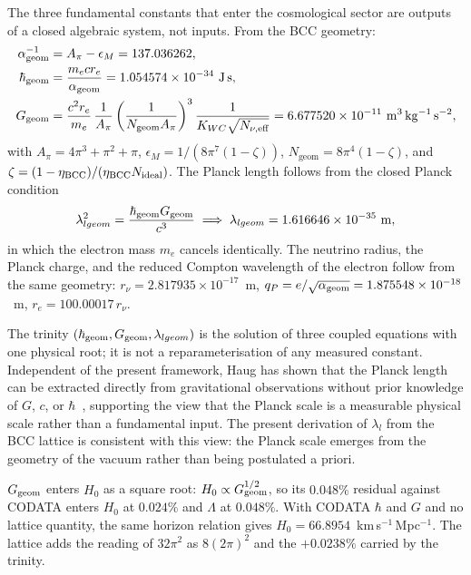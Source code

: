 \documentclass[10pt,a4paper]{article}
\begin{document}
The three fundamental constants that enter the cosmological sector are
outputs of a closed algebraic system, not inputs. From the BCC
geometry:
\begin{align}
	\alpha_{\rm geom}^{-1} &= A_\pi - \epsilon_M
	= 137.036262, \label{eq:summary_alpha}\\
	\hbar_{\rm geom} &= \frac{m_e c r_e}{\alpha_{\rm geom}}
	= 1.054574\times 10^{-34}\ {\rm J\,s}, \label{eq:summary_hbar}\\
	G_{\rm geom} &= \frac{c^2 r_e}{m_e}\,
	\frac{1}{A_\pi}\left(\frac{1}{N_{\text{geom}}A_\pi}\right)^{3}
	\frac{1}{K_{WC}\sqrt{N_{\nu,\text{eff}}}}
	= 6.677520\times 10^{-11}\ {\rm m^3\,kg^{-1}\,s^{-2}},
	\label{eq:summary_G}
\end{align}
with \(A_\pi = 4\pi^3 + \pi^2 + \pi\), \(\epsilon_M = 1/(8\pi^7(1-\zeta))\),
\(N_{\text{geom}} = 8\pi^4(1-\zeta)\), and
\(\zeta = (1-\eta_{\rm BCC})/(\eta_{\rm BCC} N_{\text{ideal}})\).
The Planck length follows from the closed Planck condition
\begin{equation}
	\lambda_{l geom}^2 = \frac{\hbar_{\rm geom} G_{\rm geom}}{c^3}
	\;\Longrightarrow\;
	\lambda_{l geom} = 1.616646\times 10^{-35}\ {\rm m},
	\label{eq:summary_lambda}
\end{equation}
in which the electron mass \(m_e\) cancels identically. The neutrino
radius, the Planck charge, and the reduced Compton wavelength of the
electron follow from the same geometry:
\(r_\nu = 2.817935\times 10^{-17}\)~m,
\(q_P = e/\sqrt{\alpha_{\rm geom}} = 1.875548\times 10^{-18}\)~m,
\(r_e = 100.00017\,r_\nu\).

The trinity \((\hbar_{\rm geom}, G_{\rm geom}, \lambda_{l geom})\) is the
solution of three coupled equations with one physical root; it is not
a reparameterisation of any measured constant. Independent of the
present framework, Haug has shown that the Planck length can be
extracted directly from gravitational observations without prior
knowledge of \(G\), \(c\), or \(\hbar\)~\cite{Haug2020JPhysCommun},
supporting the view that the Planck scale is a measurable physical
scale rather than a fundamental input. The present derivation of
\(\lambda_l\) from the BCC lattice is consistent with this view: the
Planck scale emerges from the geometry of the vacuum rather than
being postulated a priori.

$G_{\rm geom}$ enters \(H_0\) as a square root:
\(H_0 \propto G_{\rm geom}^{1/2}\), so its $0.048\%$ residual against
CODATA enters \(H_0\) at $0.024\%$ and \(\Lambda\) at $0.048\%$.
With CODATA \(\hbar\) and \(G\) and no lattice quantity, the same
horizon relation gives $H_0 = 66.8954$~km\,s$^{-1}$\,Mpc$^{-1}$. The
lattice adds the reading of $32\pi^2$ as $8(2\pi)^2$ and the
$+0.0238\%$ carried by the trinity.
\end{document}
